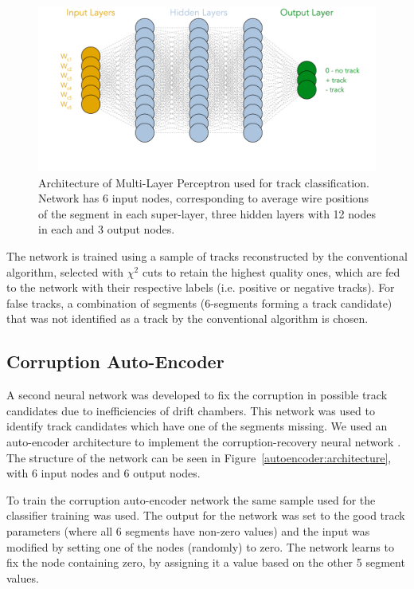\documentclass[aps,prl,preprint,12pt]{revtex4}
\begin{document}
 \begin{figure}[!ht]
\begin{center}
  \includegraphics[width=4.5in]{images/mlp_diagram.pdf}
\caption {Architecture of Multi-Layer Perceptron used for track classification. Network has 6 input nodes,
corresponding to average wire positions of the segment in each super-layer, three hidden layers with 12 nodes 
in each and 3 output nodes.}
 \label{mlp:architecture}
 \end{center}
\end{figure}

The network is trained using a sample of tracks reconstructed by the conventional algorithm, selected with 
$\chi^2$ cuts to retain the highest quality ones, which are fed to the network with their respective labels 
(i.e. positive or negative tracks). For false tracks, a combination of segments (6-segments forming a track 
candidate) that was not identified as a track by the conventional algorithm is chosen.
 
 \subsection{Corruption Auto-Encoder}
 
A second neural network was developed to fix the corruption in possible track candidates due to 
inefficiencies of drift chambers. This network was used to identify track candidates which have one of 
the segments missing. We used an auto-encoder architecture to implement the corruption-recovery 
neural network \cite{Gavalian:2020xmc}. The structure of the network can be seen in 
Figure~\ref{autoencoder:architecture}, with 6 input nodes and 6 output nodes.

To train the corruption auto-encoder network the same sample used for the classifier training was used.
The output for the network was set to the good track parameters (where all 6 segments have non-zero values) 
and the input was modified by setting one of the nodes (randomly) to zero. The network learns to fix the node 
containing zero, by assigning it a value based on the other 5 segment values. 
\end{document}
